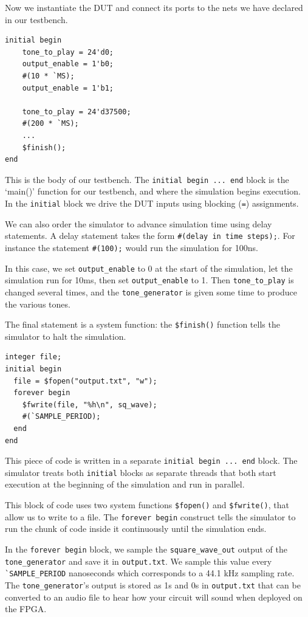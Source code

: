 \documentclass[11pt]{article}
\begin{document}
Now we instantiate the DUT and connect its ports to the nets we have declared in our testbench.

\begin{verbatim}
initial begin
    tone_to_play = 24'd0;
    output_enable = 1'b0;
    #(10 * `MS);
    output_enable = 1'b1;

    tone_to_play = 24'd37500;
    #(200 * `MS);
    ...
    $finish();
end
\end{verbatim}

This is the body of our testbench.
The \verb|initial begin ... end| block is the `main()' function for our testbench, and where the simulation begins execution.
In the \verb|initial| block we drive the DUT inputs using blocking (\verb|=|) assignments.

We can also order the simulator to advance simulation time using delay statements.
A delay statement takes the form \verb|#(delay in time steps);|.
For instance the statement \verb|#(100);| would run the simulation for 100ns.

In this case, we set \verb|output_enable| to 0 at the start of the simulation, let the simulation run for 10ms, then set \verb|output_enable| to 1.
Then \verb|tone_to_play| is changed several times, and the \verb|tone_generator| is given some time to produce the various tones.

The final statement is a system function: the \verb|$finish()| function tells the simulator to halt the simulation.

\begin{verbatim}
integer file;
initial begin
  file = $fopen("output.txt", "w");
  forever begin
    $fwrite(file, "%h\n", sq_wave);
    #(`SAMPLE_PERIOD);
  end
end
\end{verbatim}

This piece of code is written in a separate \verb|initial begin ... end| block.
The simulator treats both \verb|initial| blocks as separate threads that both start execution at the beginning of the simulation and run in parallel.

This block of code uses two system functions \verb|$fopen()| and \verb|$fwrite()|, that allow us to write to a file.
The \verb|forever begin| construct tells the simulator to run the chunk of code inside it continuously until the simulation ends.

In the \verb|forever begin| block, we sample the \verb|square_wave_out| output of the \verb|tone_generator| and save it in \verb|output.txt|.
We sample this value every \verb|`SAMPLE_PERIOD| nanoseconds which corresponds to a 44.1 kHz sampling rate.
The \verb|tone_generator|'s output is stored as 1s and 0s in \verb|output.txt| that can be converted to an audio file to hear how your circuit will sound when deployed on the FPGA.
\end{document}
